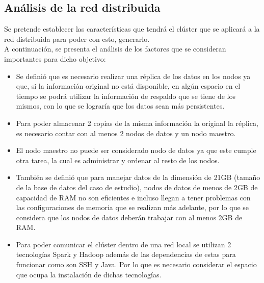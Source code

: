 \subsection{Análisis de la red distribuida}\label{seccion1}
Se pretende establecer las características que tendrá el clúster que se aplicará a la red distribuida para poder con esto, generarlo. 
\\
A continuación, se presenta el análisis de los factores que se consideran importantes para dicho objetivo: 
\\
\begin{itemize}
\item Se definió que es necesario realizar una réplica de los datos en los nodos ya que, si la información original no está disponible, en algún espacio en el tiempo se podrá utilizar la información de respaldo que se tiene de los mismos, con lo que se lograría que los datos sean más persistentes. 

\item Para poder almacenar 2 copias de la misma información la original la réplica, es necesario contar con al menos 2 nodos de datos y un nodo maestro.  
\item El nodo maestro no puede ser considerado nodo de datos ya que este cumple otra tarea, la cual es administrar y ordenar al resto de los nodos. 
\item También se definió que para manejar datos de la dimensión de 21GB (tamaño de la base de datos del caso de estudio), nodos de datos de menos de 2GB de capacidad de RAM no son eficientes e incluso llegan a tener problemas con las configuraciones de memoria que se realizan más adelante, por lo que se considera que los nodos de datos deberán trabajar con al menos 2GB de RAM. 
\item Para poder comunicar el clúster dentro de una red local se utilizan 2 tecnologías Spark y Hadoop además de las dependencias de estas para funcionar como son SSH y Java. Por lo que es necesario considerar el espacio que ocupa la instalación de dichas tecnologías. 

\end{itemize}
